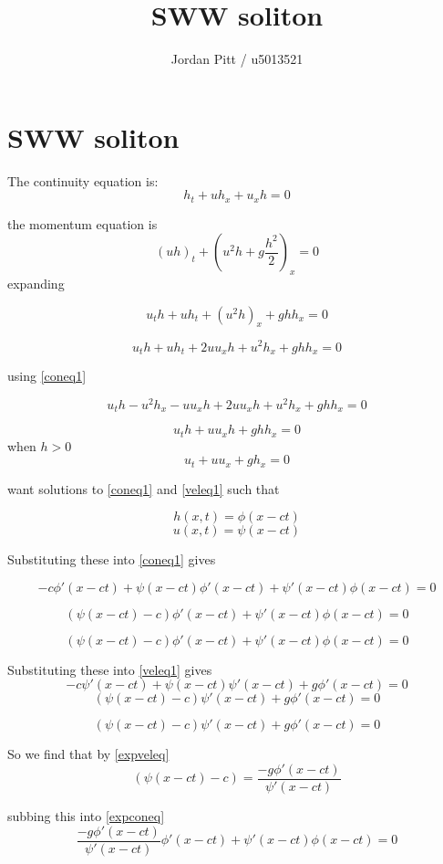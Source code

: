 \documentclass[12pt]{article}
\begin{document}
\title{SWW soliton}
\author{Jordan Pitt / u5013521}

\section{SWW soliton}
The continuity equation is:
\begin{equation}
\label{coneq1}
h_t + uh_x + u_xh = 0
\end{equation}

the momentum equation is
\[\left(uh\right)_t + \left(u^2h + g\frac{h^2}{2}\right)_x = 0\]
expanding

\[u_th + uh_t + \left(u^2h\right)_x + ghh_x = 0\]

\[u_th + uh_t + 2uu_xh + u^2h_x  + ghh_x = 0\]

using \eqref{coneq1}

\[u_th - u^2h_x - uu_xh  + 2uu_xh + u^2h_x  + ghh_x = 0\]

\[u_th + uu_xh  + ghh_x = 0\]
when $h > 0$
\begin{equation}
\label{veleq1}
u_t + uu_x  + gh_x = 0
\end{equation}

want solutions to \eqref{coneq1} and \eqref{veleq1} such that

\[h(x,t) = \phi(x - ct)\]
\[u(x,t) = \psi(x - ct)\]

Substituting these into \eqref{coneq1} gives

\[-c\phi'(x - ct) + \psi(x - ct)\phi'(x - ct) + \psi'(x - ct)\phi(x - ct) = 0\]

\[\left(\psi(x - ct) -c\right)\phi'(x - ct) + \psi'(x - ct)\phi(x - ct) = 0\]

\begin{equation}
\label{expconeq}
\left(\psi(x - ct) -c\right)\phi'(x - ct) + \psi'(x - ct)\phi(x - ct) = 0
\end{equation}

Substituting these into \eqref{veleq1} gives
\[-c\psi'(x - ct) + \psi(x - ct)\psi'(x - ct)  + g\phi'(x-ct) = 0\]
\[\left(\psi(x - ct) -c\right)\psi'(x - ct) + g\phi'(x-ct) = 0\]

\begin{equation}
\label{expveleq}
\left(\psi(x - ct) -c\right)\psi'(x - ct) + g\phi'(x-ct) = 0
\end{equation}

So we find that by \eqref{expveleq}
\[\left(\psi(x - ct) -c\right) = \frac{-g\phi'(x-ct)}{\psi'(x - ct)} \]

subbing this into \eqref{expconeq}
\[\frac{-g\phi'(x-ct)}{\psi'(x - ct)}\phi'(x - ct) + \psi'(x - ct)\phi(x - ct) = 0\]
\end{document}

